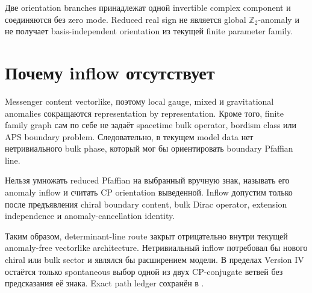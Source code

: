 \begin{theorem}
Две orientation branches принадлежат одной invertible complex component и
соединяются без zero mode. Reduced real sign не является global
\(\mathbb Z_2\)-anomaly и не получает basis-independent orientation из
текущей finite parameter family.
\end{theorem}

\section{Почему inflow отсутствует}

Messenger content vectorlike, поэтому local gauge, mixed и gravitational
anomalies сокращаются representation by representation. Кроме того, finite
family graph сам по себе не задаёт spacetime bulk operator, bordism class или
APS boundary problem. Следовательно, в текущем model data нет нетривиального
bulk phase, который мог бы ориентировать boundary Pfaffian line.

\begin{nogocriterion}
Нельзя умножать reduced Pfaffian на выбранный вручную знак, называть его
anomaly inflow и считать CP orientation выведенной. Inflow допустим только
после предъявления chiral boundary content, bulk Dirac operator, extension
independence и anomaly-cancellation identity.
\end{nogocriterion}

Таким образом, determinant-line route закрыт отрицательно внутри текущей
anomaly-free vectorlike architecture. Нетривиальный inflow потребовал бы
нового chiral или bulk sector и являлся бы расширением модели. В пределах
Version IV остаётся только spontaneous выбор одной из двух CP-conjugate
ветвей без предсказания её знака. Exact path ledger сохранён в
.